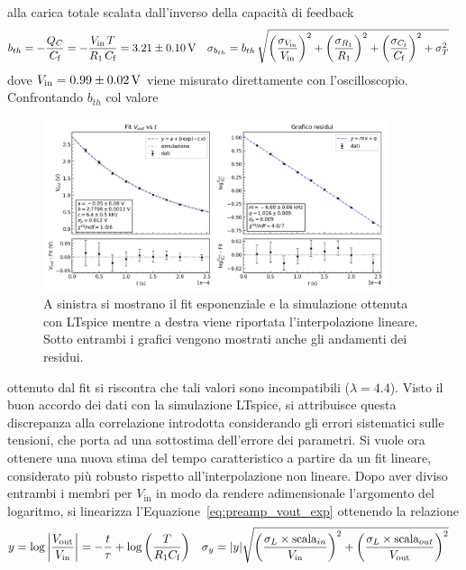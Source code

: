 alla carica totale scalata dall'inverso della capacità di feedback
\begin{align}
  b_{th}=-\frac{Q_{C}}{C_{\text f}}& =-\frac{V_{\text{in}}\,T}{R_{1}\, C_{\text{f}}}=3.21 \pm 0.10 \,\si{\volt}
  &
    \sigma_{b_{th}}& = b_{th}\,
                     \sqrt{{\left(\frac{\sigma_{V_{\text{in}}}}{V_{\text{in}}}\right)}^{2}+
                     {\left(\frac{\sigma_{R_{1}}}{R_{1}}\right)}^{2}+ {\left(\frac{\sigma_{C_{\text f}}}{C_{\text f}}\right)}^{2}+
                     \sigma_{T}^{2}}
\end{align}
dove $V_{\text{in}}= 0.99\pm 0.02 \,\si{\volt}$ viene misurato direttamente con l'oscilloscopio. Confrontando $b_{th}$ col valore
\begin{figure}[h]
\centering
\includegraphics[width=0.9\textwidth]{../preamp/images/fit_exp_lin}
\caption{\footnotesize A sinistra si mostrano il fit esponenziale e la
  simulazione ottenuta con LTspice mentre a destra viene riportata l'interpolazione lineare. Sotto entrambi i grafici vengono mostrati anche gli andamenti dei residui.}\label{fig:preamp_fit_exp_lin}
\end{figure}
\noindent ottenuto dal fit si
riscontra che tali valori sono incompatibili ($\lambda=4.4$). Visto il buon
accordo dei dati con la simulazione LTspice, si attribuisce questa
discrepanza alla correlazione introdotta considerando gli errori sistematici
sulle tensioni, che porta ad una sottostima dell'errore dei parametri.
\noindent Si vuole ora ottenere una nuova stima del tempo caratteristico a partire da
un fit lineare, considerato più robusto rispetto all'interpolazione
non lineare. Dopo aver diviso entrambi i membri per $V_{\text{in}}$ in modo da rendere
adimensionale l'argomento del logaritmo, si linearizza l'Equazione~\ref{eq:preamp_vout_exp}
ottenendo la relazione
\begin{align}
  y & = \log{\left|\frac{V_{\text{out}}}{V_{\text{in}}}\right|} = -\frac{t}{\tau}+\log{\left(\frac{T}{R_{1}C_{\text f}}\right)}
  &
    \sigma_{y}&= |y| \sqrt{{\left(\frac{\sigma_{L}\times \text{scala}_{in}}{V_{\text{in}}}\right)}^{2}+
    {\left(\frac{\sigma_{L}\times \text{scala}_{out}}{V_{\text{out}}}\right)}^{2}}
\end{align}
